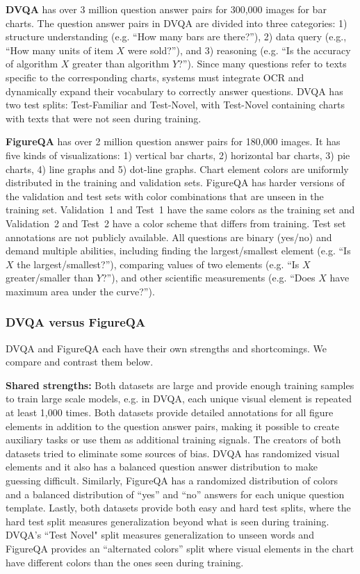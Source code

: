 \documentclass[10pt,twocolumn]{article}
\begin{document}
\textbf{DVQA} has over 3 million question answer pairs for 300,000 images for bar charts. The question answer pairs in DVQA are divided into three categories: 1) structure understanding (e.g. ``How many bars are there?''), 2) data query (e.g., ``How many units of item $X$ were sold?''), and 3) reasoning (e.g. ``Is the accuracy of algorithm $X$ greater than algorithm $Y$?''). Since many questions refer to texts specific to the corresponding charts, systems must integrate OCR and dynamically expand their vocabulary to correctly answer questions. DVQA has two test splits: Test-Familiar and Test-Novel, with Test-Novel containing charts with texts that were not seen during training.

\textbf{FigureQA} has over 2 million question answer pairs for 180,000 images. It has five kinds of visualizations: 1) vertical bar charts, 2) horizontal bar charts, 3) pie charts, 4) line graphs and 5) dot-line graphs. Chart element colors are uniformly distributed in the training and validation sets. FigureQA has harder versions of the validation and test sets with color combinations that are unseen in the training set. Validation~1 and Test~1 have the same colors as the training set and Validation~2 and Test~2 have a color scheme that differs from training. Test set annotations are not publicly available. All questions are binary (yes/no) and demand multiple abilities, including finding the largest/smallest element (e.g. ``Is $X$ the largest/smallest?''), comparing values of two elements (e.g. ``Is $X$ greater/smaller than $Y$?''), and other scientific measurements (e.g. ``Does $X$ have maximum area under the curve?''). 

\subsubsection{DVQA versus FigureQA}
DVQA and FigureQA each have their own strengths and shortcomings. We compare and contrast them below.

\textbf{Shared strengths:} Both datasets are large and provide enough training samples to train large scale models, e.g. in DVQA, each unique visual element is repeated at least 1,000 times. Both datasets provide detailed annotations for all figure elements in addition to the question answer pairs, making it possible to create auxiliary tasks or use them as additional training signals. The creators of both datasets tried to eliminate some sources of bias. DVQA has randomized visual elements and it also has a balanced question answer distribution to make guessing difficult. Similarly, FigureQA has a randomized distribution of colors and a balanced distribution of ``yes'' and ``no'' answers for each unique question template. Lastly, both datasets provide both easy and hard test splits, where the hard test split measures generalization beyond what is seen during training. DVQA's ``Test Novel" split measures generalization to unseen words and FigureQA provides an ``alternated colors'' split where visual elements in the chart have different colors than the ones seen during training.
    
\end{document}

